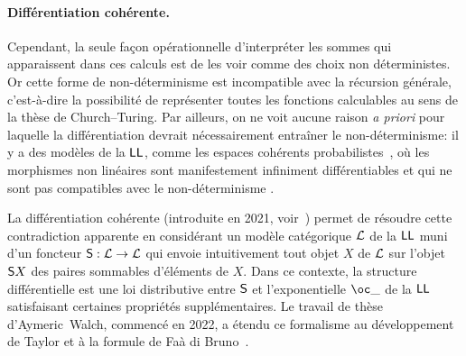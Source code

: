 \documentclass[a4]{article}
\begin{document}


\paragraph*{Différentiation cohérente.}
Cependant, la seule façon opérationnelle d'interpréter les sommes qui
apparaissent dans ces calculs est de les voir comme des choix non
déterministes.
%
Or cette forme de non-déterminisme est incompatible avec la récursion
gé\-né\-ra\-le, c’est-à-dire la possibilité de représenter toutes les
fonctions calculables au sens de la thèse de Church--Turing.
%
%
Par ailleurs, on ne voit aucune raison \emph{a priori} pour laquelle la
différentiation devrait nécessairement entraîner le non-déterminisme:
%
il y a des modèles de la $\hbox{\textsf{LL}}$, comme les espaces cohérents
probabilistes~\cite{DanosEhrhard08}, où les morphismes non linéaires
sont manifestement infiniment différentiables et qui ne sont pas
compatibles avec le non-déterminisme%
% 
.

La différentiation cohérente (introduite en 2021,
voir~\cite{Ehrhard23a}) permet de résoudre cette contradiction
apparente en considérant un modèle catégorique $\mathcal{L}$ de la $\hbox{\textsf{LL}}$ muni
d'un foncteur ${\mathsf S}:\mathcal{L}\to\mathcal{L}$ qui envoie intuitivement tout objet
$X$ de $\mathcal{L}$ sur l'objet ${\mathsf S} X$ des paires sommables d'éléments de
$X$.
%
Dans ce contexte, la structure différentielle est une loi distributive
entre ${\mathsf S}$ et l'exponentielle $\Oc\_$ de la $\hbox{\textsf{LL}}$ satisfaisant
certaines propriétés supplémentaires.
%
Le travail de thèse d'Aymeric~Walch, commencé en 2022, a étendu ce
formalisme au développement de Taylor et à la formule de Faà di
Bruno~\cite{EhrhardWalch23b}.
\end{document}

